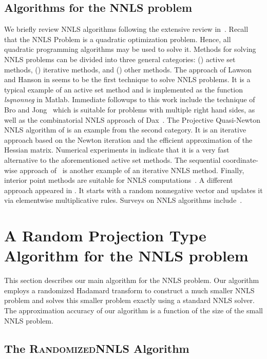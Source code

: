 \documentclass[11pt]{article}
\begin{document}
\subsection{Algorithms for the NNLS problem}
We briefly review NNLS algorithms following the extensive review
in~\cite{CP07}. Recall that the NNLS Problem is a quadratic
optimization problem. Hence, all quadratic programming algorithms
may be used to solve it. Methods for solving NNLS problems can be
divided into three general categories: () active set methods,
() iterative methods, and () other methods. The approach
of Lawson and Hanson in \cite{LH74} seems to be the first
technique to solve NNLS problems. It is a typical example of an
active set method and is implemented as the function
\emph{lsqnonneg} in Matlab. Immediate followups to this work
include the technique of Bro and Jong~\cite{BJ97} which is
suitable for problems with multiple right hand sides, as well as
the combinatorial NNLS approach of Dax~\cite{Dax91}. The
Projective Quasi-Newton NNLS algorithm of \cite{KSD07} is an
example from the second category. It is an iterative approach
based on the Newton iteration and the efficient approximation of
the Hessian matrix. Numerical experiments in \cite{KSD07} indicate
that it is a very fast alternative to the aforementioned active
set methods. The sequential coordinate-wise approach
of~\cite{FHN05} is another example of an iterative NNLS method.
Finally, interior point methods are suitable for NNLS
computations~\cite{PJV94}. A different approach appeared in
\cite{SSL02}. It starts with a random nonnegative vector  and updates it via elementwise multiplicative rules.
Surveys on NNLS algorithms include~\cite{Bjo96, LH74, KSD07}.

\section{A Random Projection Type Algorithm for the NNLS problem}
\label{sec:algo}

This section describes our main algorithm for the NNLS problem.
Our algorithm employs a randomized Hadamard transform to construct
a much smaller NNLS problem and solves this smaller problem
exactly using a standard NNLS solver. The approximation accuracy
of our algorithm is a function of the size of the small NNLS
problem.

\subsection{The \textsc{RandomizedNNLS} Algorithm}
\label{sec:RNNLS}
\end{document}
